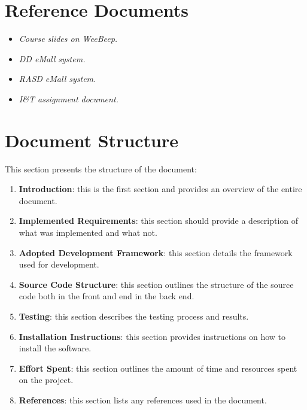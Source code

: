 \section{Reference Documents}
\begin{itemize}
    \item \emph{Course slides on WeeBeep.}
    \item \emph{DD eMall system.}
    \item \emph{RASD eMall system.}
    \item \emph{I\&T assignment document.}
\end{itemize}

\section{Document Structure}
This section presents the structure of the document:
\begin{enumerate}
    \item \textbf{Introduction}: this is the first section and provides an overview of the entire document.
    \item \textbf{Implemented Requirements}: this section should provide a description of what was implemented and what not.
    \item \textbf{Adopted Development Framework}: this section details the framework used for development.
    \item \textbf{Source Code Structure}: this section outlines the structure of the source code  both in the front and end in the back end.
    \item \textbf{Testing}: this section describes the testing process and results.
    \item \textbf{Installation Instructions}: this section provides instructions on how to install the software. 
    \item \textbf{Effort Spent}: this section outlines the amount of time and resources spent on the project.
    \item \textbf{References}: this section lists any references used in the document.
\end{enumerate}